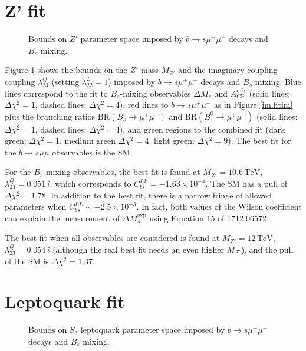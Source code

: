 \documentclass[11pt, a4paper]{article}
\begin{document}
\section{Z' fit}
\begin{figure}[H]
\centering
\resizebox{0.6\textwidth}{!}{}
\caption{Bounds on $Z'$ parameter space imposed by $b\to s \mu^+ \mu^-$ decays and $B_s$ mixing.}\label{im:WCZ}
\end{figure}

Figure \ref{im:WCZ} shows the bounds on the $Z'$ mass $M_{Z'}$ and the imaginary coupling coupling $\lambda_{23}^Q$ (setting $\lambda_{22}^L=1$) imposed by $b\to s \mu^+ \mu^-$ decays and $B_s$ mixing. Blue lines correspond to the fit to $B_s$-mixing observables $\Delta M_s$ and $A_{\mathrm{CP}}^{\mathrm{mix}}$ (solid lines: $\Delta \chi^2 = 1$, dashed lines: $\Delta \chi^2 = 4$), red lines to $b\to s \mu^+ \mu^-$ as in Figure \ref{im:fitim} plus the branching ratios $\mathrm{BR}(B_s\to \mu^+ \mu^-)$ and $\mathrm{BR}(B^0 \to \mu^+ \mu^-)$ (solid lines: $\Delta \chi^2 = 1$, dashed lines: $\Delta \chi^2 = 4$), and green regions to the combined fit (dark green: $\Delta \chi^2 = 1$, medium green $\Delta \chi^2 = 4$, light green: $\Delta \chi^2 = 9$). The best fit for the $b\to s\mu\mu$ observables is the SM. 

For the $B_s$-mixing observables, the best fit is found at $M_{Z'}= 10.6\,\mathrm{TeV}$, $\lambda_{23}^Q = 0.051\,i$, which corresponds to $C_{bs}^{LL}= -1.63\times 10^{-4}$. The SM has a pull of $\Delta \chi^2 = 1.78$. In addition to the best fit, there is a narrow fringe of allowed parameters when $C_{bs}^{LL} \sim - 2.5\times 10^{-3}$. In fact, both values of the Wilson coefficient can explain the measurement of $\Delta M_s^{\mathrm{exp}}$ using Equation 15 of 1712.06572.

The best fit when all observables are considered is found at $M_{Z'} = 12\, \mathrm{TeV}$, $\lambda_{23}^Q = 0.054\,i$ (although the real best fit needs an even higher $M_{Z'}$), and the pull of the SM is $\Delta \chi^2 = 1.37$.  
\section{Leptoquark fit}
\begin{figure}[H]
\centering
\resizebox{0.6\textwidth}{!}{}
\caption{Bounds on $S_3$ leptoquark parameter space imposed by $b\to s \mu^+ \mu^-$ decays and $B_s$ mixing.}\label{im:WCLQ}
\end{figure}
\end{document}
